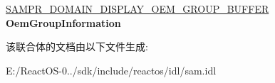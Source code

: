 \begin{DoxyCompactItemize}
\item 
\mbox{\label{union___s_a_m_p_r___d_i_s_p_l_a_y___i_n_f_o___b_u_f_f_e_r_a5f539919ac5c340e1a675a4392bf868b}} 
\hyperlink{struct___s_a_m_p_r___d_o_m_a_i_n___d_i_s_p_l_a_y___o_e_m___g_r_o_u_p___b_u_f_f_e_r}{S\+A\+M\+P\+R\+\_\+\+D\+O\+M\+A\+I\+N\+\_\+\+D\+I\+S\+P\+L\+A\+Y\+\_\+\+O\+E\+M\+\_\+\+G\+R\+O\+U\+P\+\_\+\+B\+U\+F\+F\+ER} {\bfseries Oem\+Group\+Information}
\end{DoxyCompactItemize}


该联合体的文档由以下文件生成\+:\begin{DoxyCompactItemize}
\item 
E\+:/\+React\+O\+S-\/0../sdk/include/reactos/idl/sam.\+idl\end{DoxyCompactItemize}
